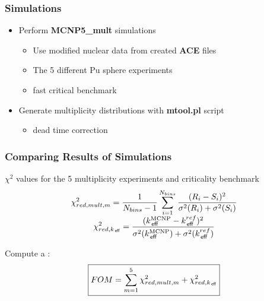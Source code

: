 \begin{frame}
\frametitle{Simulations}
\pause
\begin{itemize}
  \item Perform \textbf{MCNP5\_mult} simulations
	\begin{itemize}
	\item Use modified nuclear data from created \textbf{ACE} files
  \item The 5 different Pu sphere  experiments
	\item {} fast critical benchmark
	\end{itemize}
	\pause
	\item Generate multiplicity distributions with \textbf{mtool.pl} script
	\begin{itemize}
	  \item {} dead time correction
	\end{itemize} 

\end{itemize}

\end{frame} 



\begin{frame}
\frametitle{Comparing Results of Simulations}
\begin{itemize}
	{\small \pause
	\item {} $\chi^2$ values for the 5 multiplicity experiments and criticality benchmark
	\begin{equation*}
		\begin{array}{c} 
	\displaystyle	\chi^2_{red,mult,m} = \frac{1}{N_{bins}-1}\sum_{i=1}^{N_{bins}} \frac{(R_i - S_i)^2}{\sigma^2(R_i) + 
			\sigma^2(S_i)} 
		\\[5pt] \displaystyle \chi^2_{red,k_{\,\mathsf{eff}}} = \frac{(k_{\,\mathsf{eff}}^{\textrm{MCNP}} - k_{\,\mathsf{eff}}^{ref})^2}{\sigma^2(k_{\,\mathsf{eff}}^{\textrm{MCNP}}) + \sigma^2(k_{\,\mathsf{eff}}^{ref})}
		\end{array}
	\end{equation*} \pause
	\item Compute a :
	\begin{equation*}
	 \boxed{FOM = \sum_{m=1}^5 \chi^2_{red,mult,m} + \chi^2_{red,k_{\,\mathsf{eff}}}}
	\end{equation*} 
}
\end{itemize}

\end{frame} 

